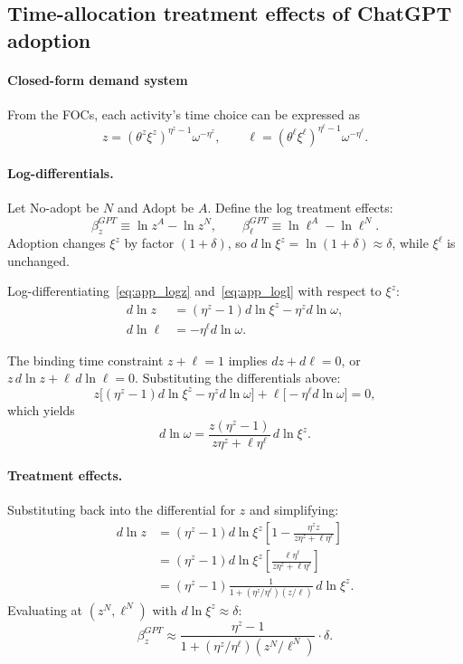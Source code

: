 \documentclass[12pt]{article}
\begin{document}
\subsection{Time-allocation treatment effects of ChatGPT adoption} \label{app:effects}

\paragraph{Closed-form demand system}
From the FOCs, each activity's time choice can be expressed as
\begin{equation}
\label{eq:app_demand}
z=(\theta^z\xi^z)^{\eta^z-1}\omega^{-\eta^z},
\qquad
\ell=(\theta^\ell\xi^\ell)^{\eta^\ell-1}\omega^{-\eta^\ell}.
\end{equation}

\paragraph{Log-differentials.}
Let No-adopt be $N$ and Adopt be $A$. Define the log treatment effects:
\[
\beta_z^{GPT}\equiv \ln z^A-\ln z^N,
\qquad
\beta_\ell^{GPT}\equiv \ln \ell^A-\ln \ell^N.
\]
Adoption changes $\xi^z$ by factor $(1+\delta)$, so $d\ln\xi^z=\ln(1+\delta)\approx \delta$, while $\xi^\ell$ is unchanged.

Log-differentiating~\eqref{eq:app_logz} and~\eqref{eq:app_logl} with respect to $\xi^z$:
\begin{align*}
d\ln z &= (\eta^z-1)d\ln\xi^z-\eta^z d\ln\omega,\\
d\ln \ell &= -\eta^\ell d\ln\omega.
\end{align*}

The binding time constraint $z+\ell=1$ implies $dz+d\ell=0$, or $z\,d\ln z+\ell\,d\ln \ell=0$. Substituting the differentials above:
\[
z\big[(\eta^z-1)d\ln\xi^z-\eta^z d\ln\omega\big]+\ell\big[-\eta^\ell d\ln\omega\big]=0,
\]
which yields
\[
d\ln\omega=\frac{z(\eta^z-1)}{z\eta^z+\ell\eta^\ell}\,d\ln\xi^z.
\]

\paragraph{Treatment effects.}
Substituting back into the differential for $z$ and simplifying:
\begin{align*}
d\ln z
&=(\eta^z-1)d\ln\xi^z\left[1-\frac{\eta^zz}{z\eta^z+\ell\eta^\ell}\right]\\
&=(\eta^z-1)d\ln\xi^z\left[\frac{\ell\eta^\ell}{z\eta^z+\ell\eta^\ell}\right]\\
&=(\eta^z-1)\frac{1}{1+\left(\eta^z/\eta^\ell\right)\left(z/\ell\right)}\,d\ln\xi^z.
\end{align*}
Evaluating at $(z^N,\ell^N)$ with $d\ln\xi^z\approx\delta$:
\begin{equation}
\label{eq:app_betaz}
\beta_z^{GPT}
\approx
\frac{\eta^z-1}{1+\left(\eta^z/\eta^\ell\right)\left(z^N/\ell^N\right)}\cdot \delta.
\end{equation}
\end{document}
